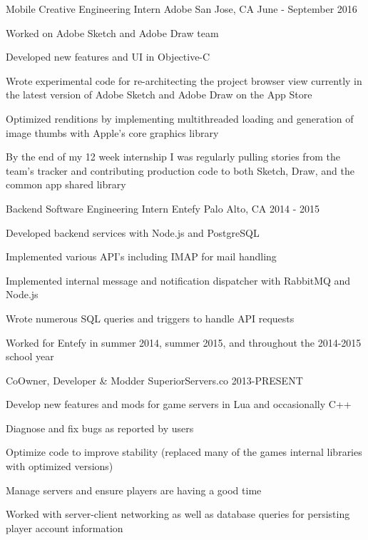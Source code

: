 \begin{cventries}
  \cventry
    {Mobile Creative Engineering Intern}
    {Adobe}
    {San Jose, CA}
    {June - September 2016}
    {
      \begin{cvitems}
        \item Worked on Adobe Sketch and Adobe Draw team
        \item Developed new features and UI in Objective-C
        \item Wrote experimental code for re-architecting the project browser view currently in the latest version of Adobe Sketch and Adobe Draw on the App Store
        \item Optimized renditions by implementing multithreaded loading and generation of image thumbs with Apple's core graphics library
        \item By the end of my 12 week internship I was regularly pulling stories from the team's tracker and contributing production code to both Sketch, Draw, and the common app shared library
      \end{cvitems}
    }
  \cventry
    {Backend Software Engineering Intern}
    {Entefy}
    {Palo Alto, CA}
    {2014 - 2015}
    {
      \begin{cvitems}
        \item {Developed backend services with Node.js and PostgreSQL}
        \item {Implemented various API's including IMAP for mail handling}
        \item {Implemented internal message and notification dispatcher with RabbitMQ and Node.js}
        \item {Wrote numerous SQL queries and triggers to handle API requests}
        \item {Worked for Entefy in summer 2014, summer 2015, and throughout the 2014-2015 school year}
      \end{cvitems}
    }
  \cventry
    {CoOwner, Developer \& Modder}
    {SuperiorServers.co}
    {}
    {2013-PRESENT}
    {
      \begin{cvitems}
        \item {Develop new features and mods for game servers in Lua and occasionally C++}
        \item {Diagnose and fix bugs as reported by users}
        \item {Optimize code to improve stability (replaced many of the games internal libraries with optimized versions)}
        \item {Manage servers and ensure players are having a good time}
        \item {Worked with server-client networking as well as database queries for persisting player account information}
      \end{cvitems}
    }


\end{cventries}
